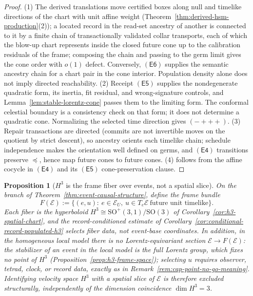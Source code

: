 \documentclass[11pt]{article}
\newtheorem{proposition}[theorem]{Proposition}
\begin{document}
\begin{proof}
(1) The derived translations move certified boxes along null and timelike
directions of the chart with unit affine weight
(Theorem~\ref{thm:derived-hsm-production}(2)); a located record in the
read-set ancestry of another is connected to it by a finite chain of
transactionally validated collar transports, each of which the blow-up chart
represents inside the closed future cone up to the calibration residuals of
the frame; composing the chain and passing to the germ limit gives the cone
order with \(o(1)\) defect. Conversely, \(\mathsf{(E6)}\) supplies the semantic
ancestry chain for a chart pair in the cone interior. Population density alone
does not imply directed reachability. (2) Receipt \(\mathsf{(E5)}\) supplies
the nondegenerate quadratic form, its inertia, fit residual, and wrong-signature
controls, and Lemma~\ref{lem:stable-lorentz-cone} passes them to the limiting form. The conformal celestial boundary is a consistency check on that
form; it does not determine a quadratic cone. Normalizing the selected time
direction gives \((-{+}{+}{+})\). (3) Repair transactions are directed (commits are not
invertible moves on the quotient by strict descent), so ancestry orients each
timelike chain; schedule independence makes the orientation well defined on
germs, and \(\mathsf{(E4)}\) transitions preserve \(\preceq\), hence map
future cones to future cones. (4) follows from the affine cocycle in
\(\mathsf{(E4)}\) and its \(\mathsf{(E5)}\) cone-preservation clause.
\end{proof}

\begin{proposition}[\(H^3\) is the frame fiber over events, not a spatial slice]
\label{prop:h3-fiber-not-slice}
On the branch of Theorem~\ref{thm:event-causal-structure}, define the frame
bundle
\[
F(\mathcal E):=\bigl\{(e,u):\ e\in\mathcal E_U,\
u\in T_e\mathcal E\ \text{future unit timelike}\bigr\}.
\]
Each fiber is the hyperboloid \(H^3\cong\mathrm{SO}^{+}(3,1)/\mathrm{SO}(3)\)
of Corollary~\ref{cor:h3-spatial-chart}, and the record-conditioned estimate of
Corollary~\ref{cor:conditional-record-populated-h3} selects \emph{fiber} data,
not event-base coordinates. In addition, in
the homogeneous local model there is no Lorentz-equivariant section
\(\mathcal E\to F(\mathcal E)\): the stabilizer of an event in the local model
is the full Lorentz group, which fixes no point of \(H^3\)
(Proposition~\ref{prop:h3-frame-space}); selecting \(u\) requires observer,
tetrad, clock, or record data, exactly as in
Remark~\ref{rem:cap-point-no-go-meaning}. Identifying velocity space
\(H^3\) with a spatial slice of \(\mathcal E\) is therefore excluded
structurally, independently of the dimension coincidence
\(\dim H^3=3\).
\end{proposition}
\end{document}
